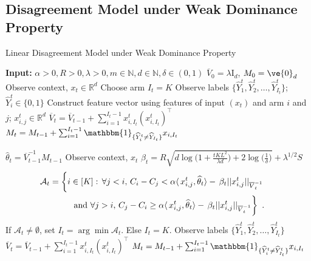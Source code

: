 \subsection{Disagreement Model under Weak Dominance Property}
\begin{algorithm}[H]
	\caption{Linear Disagreement Model under Weak Dominance Property}
	\label{algo:linDM}
	\begin{algorithmic}[1]
		\State \textbf{Input:} $\alpha > 0, R > 0, \lambda > 0, m \in \mathbb{N}, d \in \mathbb{N}, \delta \in (0,1)$
		\State $\overline{V}_0 = \lambda \mathrm{I}_d$, $M_0 = \ve{0}_d$ 
		\State Observe context, $x_t \in \mathbb{R}^d$
		\State Choose arm $I_t = K$
		\State Observe labels $\{\widehat{Y}_1^t, \widehat{Y}_2^t, \ldots, \widehat{Y}_{I_t}^t \}$; $\widehat{Y}_i^t \in \{0, 1\}$
		\State Construct feature vector using features of input $(x_t)$ and arm $i$ and $j$; $x_{i, j}^t \in \mathbb{R}^d$
		\State $\overline{V}_t = \overline{V}_{t-1} + \sum_{i=1}^{I_t-1}x_{i, I_t}^t (x_{i, I_t}^t)^\top$
		\State $M_t = M_{t-1} + \sum_{i=1}^{I_t-1}\mathbbm{1}_{\{\widehat{Y}_i^t \neq \widehat{Y}_{I_t}\}}x_{i, I_t}$ 
		\EndFor
		
		\For{$t=m+1, m+2, \ldots$}
		\State $\widehat{\theta}_t = \overline{V}_{t-1}^{-1}M_{t-1}$
		\State Observe context, $x_t$
		\State $\beta_t = R\sqrt{d\log\bigg(1 + \frac{tKL^2}{\lambda d}\bigg) + 2\log\bigg(\frac{1}{\delta}\bigg)} + \lambda^{1/2}S$
		\State \begin{align*}
\hspace{-.5cm}		\mathcal{A}_t =\bigg\{ i \in [K]:\, \forall j<i, \, C_i - C_j < \alpha\langle\,x_{i, j}^t, \widehat{\theta}_t\rangle -\, \beta_t ||x_{i,j}^t||_{\overline{V}_t^{-1}} \, \\
		\mbox{  and  }\forall j>i, \,C_j - C_i \ge\alpha\langle\,x_{i, j}^t, \widehat{\theta}_t\rangle -\, \beta_t ||x_{i,j}^t||_{\overline{V}_t^{-1}} 
		\bigg \}\enspace.
		\end{align*}
%		
%		
%		
		\State If $\mathcal{A}_t \neq \emptyset$, set $I_t= \arg\min \mathcal{A}_t$. Else $I_t=K$.
		\State Observe labels $\{\widehat{Y}_1^t, \widehat{Y}_2^t, \ldots, \widehat{Y}_{I_t}^t \}$
		\State $\overline{V}_t = \overline{V}_{t-1} + \sum_{i=1}^{I_t-1}x_{i, I_t}^t (x_{i, I_t}^t)^\top$
		\State $M_t = M_{t-1} + \sum_{i=1}^{I_t-1}\mathbbm{1}_{\{\widehat{Y}_i^t \neq \widehat{Y}_{I_t}^t\}}x_{i, I_t}$
		\EndFor
		
	\end{algorithmic}
\end{algorithm}

